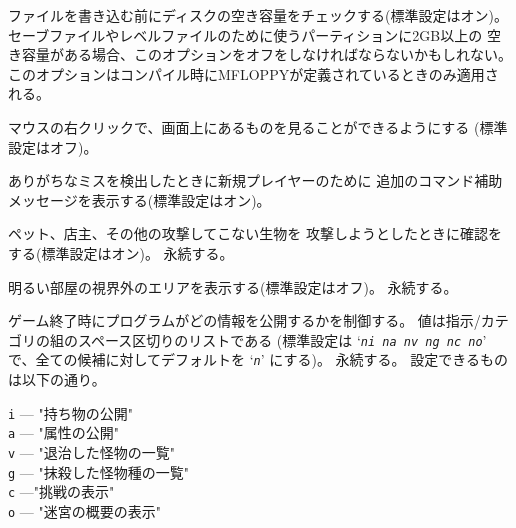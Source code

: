 \item[\ib{checkspace}]
ファイルを書き込む前にディスクの空き容量をチェックする(標準設定はオン)。
セーブファイルやレベルファイルのために使うパーティションに2GB以上の
空き容量がある場合、このオプションをオフをしなければならないかもしれない。
このオプションはコンパイル時にMFLOPPYが定義されているときのみ適用される。
\item[\ib{clicklook}]
マウスの右クリックで、画面上にあるものを見ることができるようにする
(標準設定はオフ)。
\item[\ib{cmdassist}]
ありがちなミスを検出したときに新規プレイヤーのために
追加のコマンド補助メッセージを表示する(標準設定はオン)。
\item[\ib{confirm}]
ペット、店主、その他の攻撃してこない生物を
攻撃しようとしたときに確認をする(標準設定はオン)。
永続する。
\item[\ib{dark\verb+_+room}]
明るい部屋の視界外のエリアを表示する(標準設定はオフ)。
永続する。
\item[\ib{disclose}]
ゲーム終了時にプログラムがどの情報を公開するかを制御する。
値は指示/カテゴリの組のスペース区切りのリストである
(標準設定は `{\tt {\it ni na nv ng nc no}}' で、全ての候補に対してデフォルトを
`{\tt {\it n}}' にする)。
永続する。
設定できるものは以下の通り。

{\tt i} --- "持ち物の公開"\\
{\tt a} --- "属性の公開"\\
{\tt v} --- "退治した怪物の一覧"\\
{\tt g} --- "抹殺した怪物種の一覧"\\
{\tt c} ---"挑戦の表示"\\
{\tt o} --- "迷宮の概要の表示"

